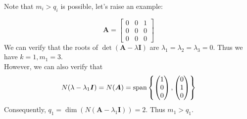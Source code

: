 Note that $m_i>q_i$ is possible, let's raise an example:
\begin{example}
\[
\bm A=\begin{bmatrix}
0&0&1\\0&0&0\\0&0&0
\end{bmatrix}
\]
We can verify that the roots of $\det(\bm A-\lambda\bm I)$ are $\lambda_1=\lambda_2=\lambda_3=0$. Thus we have $k=1,m_1=3$.\\
However, we can also verify that
\[
N(\lambda-\lambda_1\bm I)=N(\bm A)=\operatorname{span}\left\{
\begin{pmatrix}
1\\0\\0
\end{pmatrix},\begin{pmatrix}
0\\1\\0
\end{pmatrix}
\right\}
\]
Consequently, $q_1=\dim(N(\bm A-\lambda_1\bm I))=2.$ Thus $m_1>q_1$.
\end{example}

